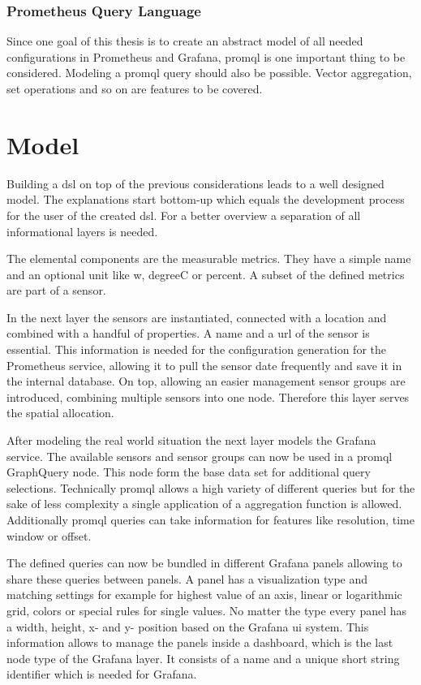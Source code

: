 \subsubsection{Prometheus Query Language}
Since one goal of this thesis is to create an abstract model of all needed configurations in Prometheus and Grafana, \gls{promql} is one important thing to be considered. Modeling a \gls{promql} query should also be possible. Vector aggregation, set operations and so on are features to be covered. 


\section{Model}

Building a \gls{dsl} on top of the previous considerations leads to a well designed model. The explanations start bottom-up which equals the development process for the user of the created \gls{dsl}. For a better overview a separation of all informational layers is needed.

The elemental components are the measurable metrics. They have a simple name and an optional unit like \gls{w}, \gls{degreeC} or \gls{percent}. A subset of the defined metrics are part of a sensor.

In the next layer the sensors are instantiated, connected with a location and combined with a handful of properties. A name and a \gls{url} of the sensor is essential. This information is needed for the configuration generation for the Prometheus service, allowing it to pull the sensor date frequently and save it in the internal database. On top, allowing an easier management sensor groups are introduced, combining multiple sensors into one node. Therefore this layer serves the spatial allocation. 

After modeling the real world situation the next layer models the Grafana service. The available sensors and sensor groups can now be used in a \gls{promql} GraphQuery node. This node form the base data set for additional query selections. Technically \gls{promql} allows a high variety of different queries but for the sake of less complexity a single application of a aggregation function is allowed. Additionally \gls{promql} queries can take information for features like resolution, time window or offset. 

The defined queries can now be bundled in different Grafana panels allowing to share these queries between panels. A panel has a visualization type and matching settings for example for highest value of an axis, linear or logarithmic grid, colors or special rules for single values. No matter the type every panel has a width, height, x- and y- position based on the Grafana \gls{ui} system. This information allows to manage the panels inside a dashboard, which is the last node type of the Grafana layer. It consists of a name and a unique short string identifier which is needed for Grafana. 

